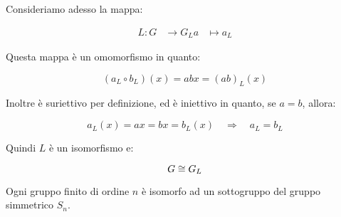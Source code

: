 \begin{dimostrazione}
	Consideriamo adesso la mappa:
	
	\begin{align}
		L: G &\longrightarrow G_L
		a &\longmapsto a_L
	\end{align}

	Questa mappa è un omomorfismo in quanto:
	
	\begin{equation}
		(a_L \circ b_L)(x) = abx = (ab)_L(x)
	\end{equation}

	Inoltre è suriettivo per definizione, ed è iniettivo in quanto, se $a = b$, allora:
	
	\begin{equation}
		a_L(x) = ax = bx = b_L(x) \quad\Longrightarrow\quad a_L = b_L
	\end{equation}

	Quindi $L$ è un isomorfismo e:
	
	\begin{equation}
		G \cong G_L
	\end{equation}
\end{dimostrazione}

\begin{corollario}
	Ogni gruppo finito di ordine $n$ è isomorfo ad un sottogruppo del gruppo simmetrico $S_n$.
\end{corollario}